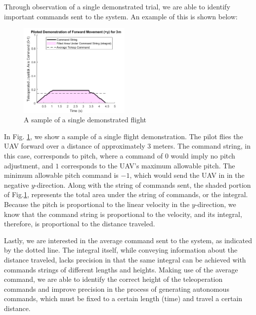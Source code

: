 \documentclass[letterpaper, 10 pt, conference]{ieeeconf}  %
\newcommand\NB[1]{$\spadesuit$\footnote{NB: #1}}
\begin{document}
Through observation of a single demonstrated trial, we are able to identify important commands sent to the system. An example of this is shown below:

\begin{figure}[ht]
    \includegraphics[width=0.48\textwidth]{images/sampleintegral.png}
    \caption{A sample of a single demonstrated flight}
    \label{fig:sampleintegral}
\end{figure}

In Fig. \ref{fig:sampleintegral}, we show a sample of a single flight demonstration. The pilot flies the UAV forward over a distance of approximately $3$ meters. The command string, in this case, corresponds to pitch, where a command of $0$ would imply no pitch adjustment, and $1$ corresponds to the UAV's maximum allowable pitch. The minimum allowable pitch command is $-1$, which would send the UAV in in the negative $y$-direction. Along with the string of commands sent, the shaded portion of Fig.\ref{fig:sampleintegral}, represents the total area under the string of commands, or the integral. Because the pitch is proportional to the linear velocity in the $y$-direction, we know that the command string is proportional to the velocity, and its integral, therefore, is proportional to the distance traveled.


Lastly, we are interested in the average command sent to the system, as indicated by the dotted line. The integral itself, while conveying information about the distance traveled, lacks precision in that the same integral can be achieved with commands strings of different lengths and heights. Making use of the average command, we are able to identify the correct height of the teleoperation commands and improve precision in the process of generating autonomous commands, which must be fixed to a certain length (time) and travel a certain distance. %
\end{document}
